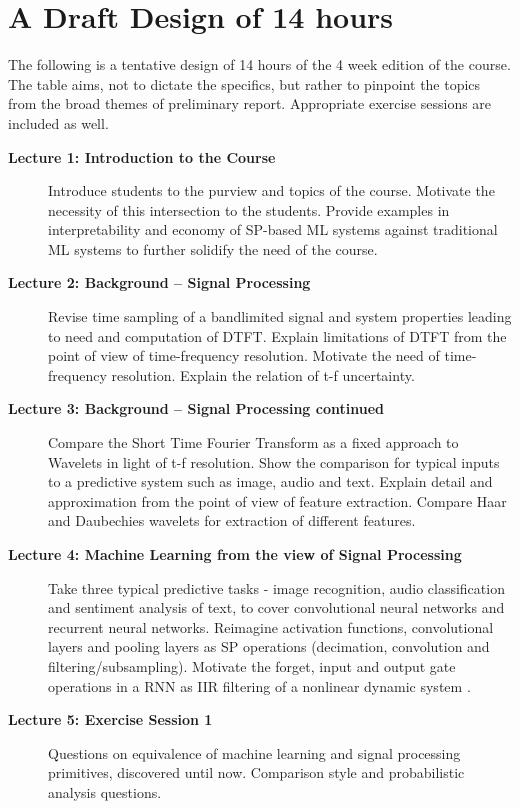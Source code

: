 \documentclass[12pt]{article}
\begin{document}
\section{A Draft Design of 14 hours}
The following is a tentative design of 14 hours of the 4 week edition of the course. The table aims, not to dictate the specifics, but rather to pinpoint the topics from the broad themes of preliminary report. Appropriate exercise sessions are included as well.
\begin{description}
    \item[\textbf{Lecture 1: Introduction to the Course}] 
    Introduce students to the purview and topics of the course. Motivate the necessity of this intersection to the students. Provide examples in interpretability and economy of SP-based ML systems against traditional ML systems to further solidify the need of the course.

    \item[\textbf{Lecture 2: Background -- Signal Processing}] 
    Revise time sampling of a bandlimited signal and system properties leading to need and computation of DTFT. Explain limitations of DTFT from the point of view of time-frequency resolution. Motivate the need of time-frequency resolution. Explain the relation of t-f uncertainty.

    \item[\textbf{Lecture 3: Background -- Signal Processing continued}] 
    Compare the Short Time Fourier Transform as a fixed approach to Wavelets in light of t-f resolution. Show the comparison for typical inputs to a predictive system such as image, audio and text. Explain detail and approximation from the point of view of feature extraction. Compare Haar and Daubechies wavelets for extraction of different features. 

    \item[\textbf{Lecture 4: Machine Learning from the view of Signal Processing}] Take three typical predictive tasks - image recognition, audio classification and sentiment analysis of text, to cover convolutional neural networks and recurrent neural networks. Reimagine activation functions, convolutional layers and pooling layers as SP operations (decimation, convolution and filtering/subsampling). Motivate the forget, input and output gate operations in a RNN as IIR filtering of a nonlinear dynamic system \cite{1, 2}.

    \item[\textbf{Lecture 5: Exercise Session 1}] 
    Questions on equivalence of machine learning and signal processing primitives, discovered until now. Comparison style and probabilistic analysis questions.


\end{description}
\end{document}
